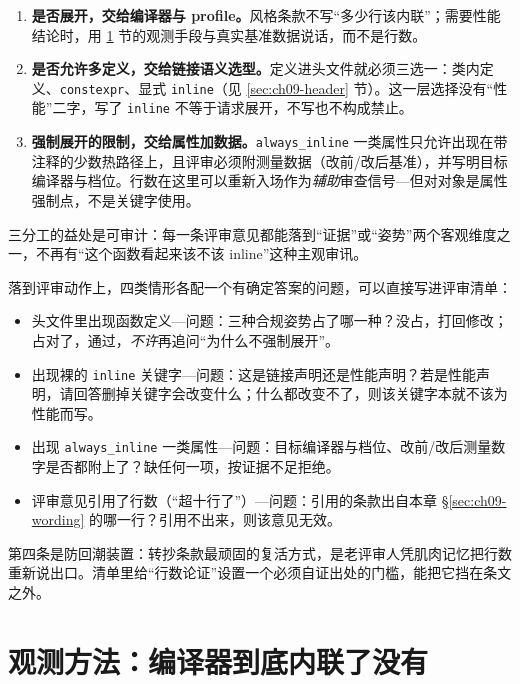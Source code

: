 \documentclass[12pt,a4paper,fontset=fandol]{ctexbook}
\newcommand{\Tp}[1]{\texttt{#1}}
\begin{document}
\begin{bestpractice}[title={展开决策、链接姿势与强制令的三分工}]
\begin{enumerate}
  \item \textbf{是否展开，交给编译器与 profile。}风格条款不写``多少行该内联''；需要性能结论时，用 \ref{sec:ch09-observe} 节的观测手段与真实基准数据说话，而不是行数。
  \item \textbf{是否允许多定义，交给链接语义选型。}定义进头文件就必须三选一：类内定义、\Tp{constexpr}、显式 \Tp{inline}（见 \ref{sec:ch09-header} 节）。这一层选择没有``性能''二字，写了 \Tp{inline} 不等于请求展开，不写也不构成禁止。
  \item \textbf{强制展开的限制，交给属性加数据。}\Tp{always\_inline} 一类属性只允许出现在带注释的少数热路径上，且评审必须附测量数据（改前/改后基准），并写明目标编译器与档位。行数在这里可以重新入场作为\textit{辅助}审查信号---但对对象是属性强制点，不是关键字使用。
\end{enumerate}
\end{bestpractice}

三分工的益处是可审计：每一条评审意见都能落到``证据''或``姿势''两个客观维度之一，不再有``这个函数看起来该不该 inline''这种主观审讯。

落到评审动作上，四类情形各配一个有确定答案的问题，可以直接写进评审清单：

\begin{itemize}
  \item 头文件里出现函数定义---问题：三种合规姿势占了哪一种？没占，打回修改；占对了，通过，\textit{不许}再追问``为什么不强制展开''。
  \item 出现裸的 \Tp{inline} 关键字---问题：这是链接声明还是性能声明？若是性能声明，请回答删掉关键字会改变什么；什么都改变不了，则该关键字本就不该为性能而写。
  \item 出现 \Tp{always\_inline} 一类属性---问题：目标编译器与档位、改前/改后测量数字是否都附上了？缺任何一项，按证据不足拒绝。
  \item 评审意见引用了行数（``超十行了''）---问题：引用的条款出自本章 \S\ref{sec:ch09-wording} 的哪一行？引用不出来，则该意见无效。
\end{itemize}

第四条是防回潮装置：转抄条款最顽固的复活方式，是老评审人凭肌肉记忆把行数重新说出口。清单里给``行数论证''设置一个必须自证出处的门槛，能把它挡在条文之外。

\section{观测方法：编译器到底内联了没有}
\label{sec:ch09-observe}
\end{document}
